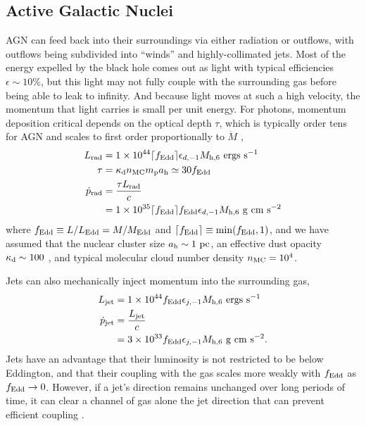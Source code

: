 \documentclass[preprint2]{aastex}
\newcommand{\mhsix}{M_{\rm h,6}\xspace}
\begin{document}
\subsection{Active Galactic Nuclei}\label{subsec:agn}

AGN can feed back into their surroundings via either radiation or outflows, with outflows being subdivided into ``winds'' and highly-collimated jets. Most of the energy expelled by the black hole comes out as light with typical efficiencies $\epsilon \sim 10\%$, but this light may not fully couple with the surrounding gas before being able to leak to infinity. And because light moves at such a high velocity, the momentum that light carries is small per unit energy. For photons, momentum deposition critical depends on the optical depth $\tau$, which is typically order tens for AGN \citep{Nenkova:2008b} and scales to first order proportionally to $\dot{M}$ \citep{Netzer:2006a},
\begin{align}
L_{\rm rad} &= 1 \times 10^{44} \lceil f_{\rm Edd} \rceil \epsilon_{d,-1} \mhsix~{\rm ergs~s}^{-1}\\
\tau &= \kappa_{\rm d} n_{\rm MC} m_{\rm p} a_{\rm h} \simeq 30 f_{\rm Edd}\label{eq:agntau}\\
\dot{p}_{\rm rad} &= \frac{\tau L_{\rm rad}}{c}\nonumber\\
&=1 \times 10^{35} \lceil f_{\rm Edd} \rceil f_{\rm Edd} \epsilon_{d,-1} \mhsix ~{\rm g~cm~s}^{-2}\label{eq:pagnrad}
\end{align}
where $f_{\rm Edd} \equiv L/L_{\rm Edd} = M/M_{\rm Edd}$ and $\lceil f_{\rm Edd} \rceil \equiv \min(f_{\rm Edd},1)$, and we have assumed that the nuclear cluster size $a_{\rm h} \sim 1~{\rm pc}$, an effective dust opacity $\kappa_{\rm d} \sim 100$ \citep{Li:2001a}, and typical molecular cloud number density $n_{\rm MC} = 10^{4}$.

Jets can also mechanically inject momentum into the surrounding gas,
\begin{align}
L_{\rm jet} &= 1 \times 10^{44} f_{\rm Edd} \epsilon_{j,-1} \mhsix~{\rm ergs~s}^{-1}\\
\dot{p}_{\rm jet} &= \frac{L_{\rm jet}}{c}\nonumber\\
&=3 \times 10^{33} f_{\rm Edd} \epsilon_{j,-1} \mhsix~{\rm g~cm~s}^{-2}\label{eq:pagnjet}.
\end{align}
Jets have an advantage that their luminosity is not restricted to be below Eddington, and that their coupling with the gas scales more weakly with $f_{\rm Edd}$ as $f_{\rm Edd} \rightarrow 0$. However, if a jet's direction remains unchanged over long periods of time, it can clear a channel of gas alone the jet direction that can prevent efficient coupling \citep{Heinz:2014a}. 
\end{document}
